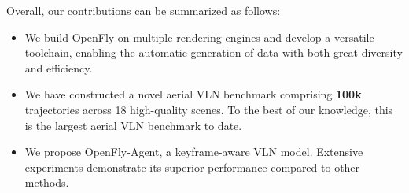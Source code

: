 Overall, our contributions can be summarized as follows:
\begin{itemize}[left=0pt]
\item  We build OpenFly on multiple rendering engines and develop a versatile toolchain, enabling the automatic generation of data with both great diversity and efficiency.

\item  We have constructed a novel aerial VLN benchmark comprising \textbf{100k} trajectories across 18 high-quality scenes. To the best of our knowledge, this is the largest aerial VLN benchmark to date.

\item  We propose OpenFly-Agent, a keyframe-aware VLN model. Extensive experiments demonstrate its superior performance compared to other methods. 
\end{itemize}
